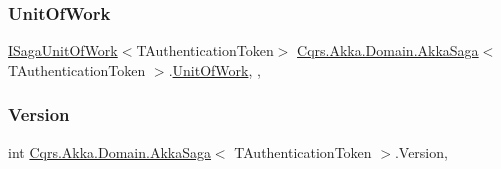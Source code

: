 \subsubsection{\texorpdfstring{Unit\+Of\+Work}{UnitOfWork}}
{\footnotesize\ttfamily \hyperlink{interfaceCqrs_1_1Domain_1_1ISagaUnitOfWork}{I\+Saga\+Unit\+Of\+Work}$<$T\+Authentication\+Token$>$ \hyperlink{classCqrs_1_1Akka_1_1Domain_1_1AkkaSaga}{Cqrs.\+Akka.\+Domain.\+Akka\+Saga}$<$ T\+Authentication\+Token $>$.\hyperlink{classCqrs_1_1Domain_1_1UnitOfWork}{Unit\+Of\+Work}\hspace{0.3cm}{\ttfamily [get]}, {\ttfamily [set]}, {\ttfamily [protected]}}

\mbox{\label{classCqrs_1_1Akka_1_1Domain_1_1AkkaSaga_a3fda31a3857e12a1aed60f4a4f04edd1_a3fda31a3857e12a1aed60f4a4f04edd1}} 
\subsubsection{\texorpdfstring{Version}{Version}}
{\footnotesize\ttfamily int \hyperlink{classCqrs_1_1Akka_1_1Domain_1_1AkkaSaga}{Cqrs.\+Akka.\+Domain.\+Akka\+Saga}$<$ T\+Authentication\+Token $>$.Version\hspace{0.3cm}{\ttfamily [get]}, {}}

